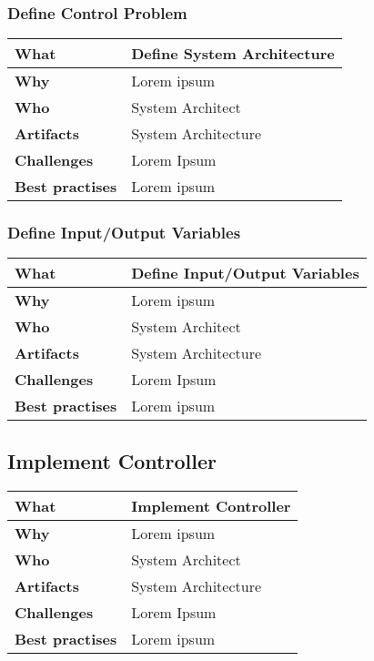 \subsubsection{Define Control Problem}
 \label{table:ch6_Task_Define_Control_Problem}
\begin{tabular}
	{|m{3cm}|m{10cm}|} \hline \bfseries What & Define System Architecture\\
	\hline \bfseries Why & Lorem ipsum\\
	\hline \bfseries Who & System Architect\\
	\hline \bfseries Artifacts & System Architecture\\
	\hline \bfseries Challenges & Lorem Ipsum\\
	\hline \bfseries Best practises & Lorem ipsum\\
	\hline 
\end{tabular}

\subsubsection{Define Input/Output Variables}
 \label{table:ch6_Task_Define_Controller_Variables}
\begin{tabular}
	{|m{3cm}|m{10cm}|} \hline \bfseries What & Define Input/Output Variables\\
	\hline \bfseries Why & Lorem ipsum\\
	\hline \bfseries Who & System Architect\\
	\hline \bfseries Artifacts & System Architecture\\
	\hline \bfseries Challenges & Lorem Ipsum\\
	\hline \bfseries Best practises & Lorem ipsum\\
	\hline 
\end{tabular}

\subsection{Implement Controller}
 \label{table:ch6_Task_Implement_Controller}
\begin{tabular}
	{|m{3cm}|m{10cm}|} \hline \bfseries What & Implement Controller\\
	\hline \bfseries Why & Lorem ipsum\\
	\hline \bfseries Who & System Architect\\
	\hline \bfseries Artifacts & System Architecture\\
	\hline \bfseries Challenges & Lorem Ipsum\\
	\hline \bfseries Best practises & Lorem ipsum\\
	\hline 
\end{tabular}

